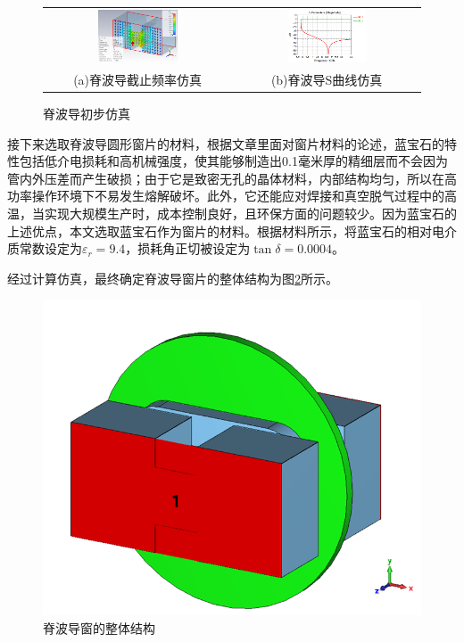 \documentclass[master]{thesis-uestc}
\begin{document}
\begin{figure}[!htb]
    \small
    \centering
    \begin{tabular}{@{\ }c@{\ }c}
        \includegraphics[width=0.45\textwidth]{pic/chapter3/脊波导初步仿真.png} & 
        \hspace{5pt}
        \includegraphics[width=0.45\textwidth]{pic/chapter3/输入窗脊波导S曲线.png}     \\
        \mbox{\small (a)脊波导截止频率仿真}                                                                               & 
        \mbox{\small (b)脊波导S曲线仿真}                                                                                  \\
    \end{tabular}
    \caption{脊波导初步仿真}
    \label{fig:脊波导初步仿真}
\end{figure}

接下来选取脊波导圆形窗片的材料，根据文章\cite{han_sapphire_2011}里面对窗片材料的论述，蓝宝石的特性包括低介电损耗和高机械强度，使其能够制造出0.1毫米厚的精细层而不会因为管内外压差而产生破损；由于它是致密无孔的晶体材料，内部结构均匀，所以在高功率操作环境下不易发生熔解破坏。此外，它还能应对焊接和真空脱气过程中的高温，当实现大规模生产时，成本控制良好，且环保方面的问题较少。因为蓝宝石的上述优点，本文选取蓝宝石作为窗片的材料。根据材料\cite{thumm_2020_State}所示，将蓝宝石的相对电介质常数设定为$\varepsilon_r=9.4$，损耗角正切被设定为$\tan \delta = 0.0004$。

经过计算仿真，最终确定脊波导窗片的整体结构为图\ref{fig:脊波导窗的整体结构}所示。
\begin{figure}[!htb]
    \centering
    \includegraphics[width=0.45\linewidth]{pic/chapter3/输入窗的总体视图.png}
    \caption{脊波导窗的整体结构}
    \label{fig:脊波导窗的整体结构}
\end{figure}
\end{document}
